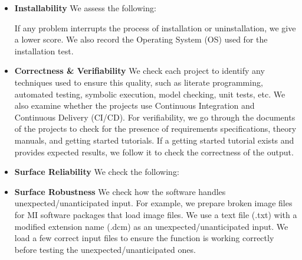 \documentclass[11pt]{article}
\begin{document}
\begin{itemize}

\item \textbf{Installability} We assess the following: 
If any problem interrupts the process of installation or uninstallation, we give
a lower score. We also record the Operating System (OS) used for the
installation test.

\item \textbf{Correctness \& Verifiability} We check each project to identify
any techniques used to ensure this quality, such as literate programming,
automated testing, symbolic execution, model checking, unit tests, etc. We also
examine whether the projects use Continuous Integration and Continuous Delivery
(CI/CD). For verifiability, we go through the documents of the projects to check
for the presence of requirements specifications, theory manuals, and getting
started tutorials. If a getting started tutorial exists and provides expected
results, we follow it to check the correctness of the output.

\item \textbf{Surface Reliability} We check the following: 

\item \textbf{Surface Robustness} We check how the software handles
unexpected/unanticipated input. For example, we prepare broken image files for
MI software packages that load image files. We use a text file (.txt) with a
modified extension name (.dcm) as an unexpected/unanticipated input. We load a
few correct input files to ensure the function is working correctly before
testing the unexpected/unanticipated ones.


\end{itemize}
\end{document}
